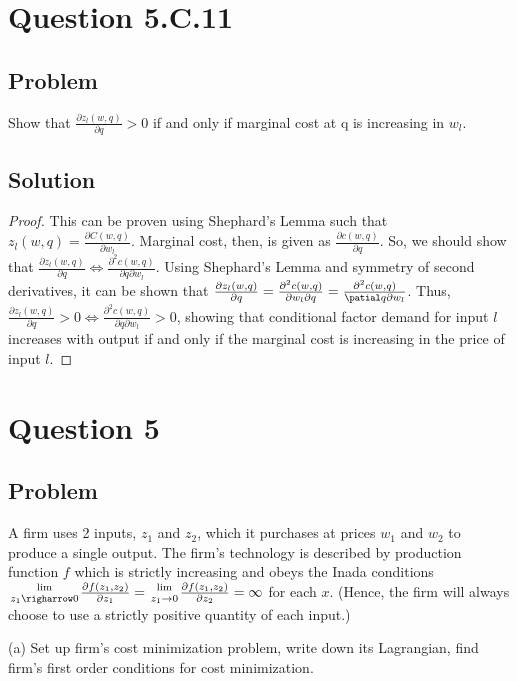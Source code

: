 \documentclass[10pt, a4paper]{article}
\begin{document}
  \section{Question 5.C.11}
    \subsection{Problem}
      Show that $\frac{\partial z_l(w,q)}{\partial q}>0$ if and only if marginal cost at q is increasing in $w_l$.
    \subsection{Solution}
      \begin{proof}
        This can be proven using Shephard's Lemma such that $z_l(w,q) = \frac{\partial C(w,q)}{\partial w_l}$. Marginal cost, then, is given as $\frac{\partial c(w,q)}{\partial q}$. So, we should show that $\frac{\partial z_l (w,q)}{\partial q}\Leftrightarrow \frac{\partial^2c(w,q)}{\partial q\partial w_l}$. Using Shephard's Lemma and symmetry of second derivatives, it can be shown that $\frac{\partial z_l(w,q)}{\partial q} = \frac{\partial^2 c(w,q)}{\partial w_l\partial q}=\frac{\partial^2 c(w,q)}{\patial q\partial w_l}$. Thus, $\frac{\partial z_l(w,q)}{\partial q}>0\Leftrightarrow \frac{\partial^2c(w,q)}{\partial q\partial w_l}>0$, showing that conditional factor demand for input $l$ increases with output if and only if the marginal cost is increasing in the price of input $l$.
      \end{proof}
  \section{Question 5}
    \subsection{Problem}
      A firm uses 2 inputs, $z_1$ and $z_2$, which it purchases at prices $w_1$ and $w_2$ to produce a single output. The firm's technology is described by production function $f$ which is strictly increasing and obeys the Inada conditions ${\lim\atop{z_1\righarrow0}}\frac{\partial f(z_1,z_2)}{\partial z_1}={\lim\atop{z_1\rightarrow0}}\frac{\partial f(z_1, z_2)}{\partial z_2}=\infty$ for each $x$. (Hence, the firm will always choose to use a strictly positive quantity of each input.)

      (a) Set up firm's cost minimization problem, write down its Lagrangian, find firm's first order conditions for cost minimization.
\end{document}
